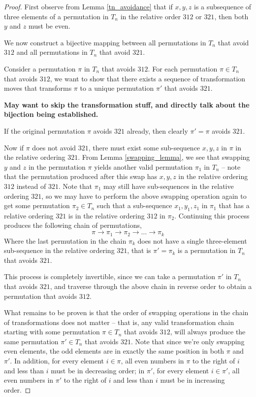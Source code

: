 \documentclass[11pt,letterpaper,twoside,english]{article}
\theoremstyle{theorem}
\theoremstyle{remark}
\begin{document}
\begin{proof}
First observe from Lemma \ref{tn_avoidance} that if $x, y, z$ is a subsequence of three elements of a permutation in $T_n$ in the relative order $312$ or $321$, then both $y$ and $z$ must be even.

We now construct a bijective mapping between all permutations in $T_n$ that avoid $312$ and all permutations in $T_n$ that avoid $321$.

Consider a permutation $\pi$ in $T_n$ that avoids $312$. For each permutation $\pi \in T_n$ that avoids $312$, we want to show that there exists a sequence of transformation moves that transforms $\pi$ to a unique permutation $\pi'$ that avoids $321$.

\textbf{May want to skip the transformation stuff, and directly talk about the bijection being established.}

If the original permutation $\pi$ avoids $321$ already, then clearly $\pi' = \pi$ avoids $321$.

Now if $\pi$ does not avoid $321$, there must exist some sub-sequence $x, y, z$ in $\pi$ in the relative ordering $321$. From Lemma \ref{swapping_lemma}, we see that swapping $y$ and $z$ in the permutation $\pi$ yields another valid permutation $\pi_1$ in $T_n$ -- note that the permutation produced after this swap has $x, y, z$ in the relative ordering $312$ instead of $321$. Note that $\pi_1$ may still have sub-sequences in the relative ordering $321$, so we may have to perform the above swapping operation again to get some permutation $\pi_2 \in T_n$ such that a sub-sequence $x_1, y_1, z_1$ in $\pi_1$ that has a relative ordering $321$ is in the relative ordering $312$ in $\pi_2$. Continuing this process produces the following chain of permutations,
$$\pi \rightarrow \pi_1 \rightarrow \pi_2 \rightarrow \ldots \rightarrow \pi_k$$
Where the last permutation in the chain $\pi_k$ does not have a single three-element sub-sequence in the relative ordering $321$, that is $\pi' = \pi_k$ is a permutation in $T_n$ that avoids $321$.

This process is completely invertible, since we can take a permutation $\pi'$ in $T_n$ that avoids $321$, and traverse through the above chain in reverse order to obtain a permutation that avoids $312$.

What remains to be proven is that the order of swapping operations in the chain of transformations does not matter -- that is, any valid transformation chain starting with some permutation $\pi \in T_n$ that avoids $312$, will always produce the same permutation $\pi' \in T_n$ that avoids $321$. Note that since we're only swapping even elements, the odd elements are in exactly the same position in both $\pi$ and $\pi'$. In addition, for every element $i \in \pi$, all even numbers in $\pi$ to the right of $i$ and less than $i$ must be in decreasing order; in $\pi'$, for every element $i \in \pi'$, all even numbers in $\pi'$ to the right of $i$ and less than $i$ must be in increasing order.


\end{proof}
\end{document}
